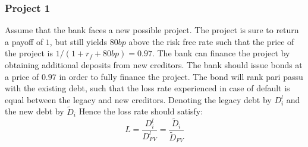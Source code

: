 \documentclass[10pt,a4paper]{article}
\begin{document}
    \subsubsection{Project 1}
            \newcommand{\legacydebt}{D_{i}^{l}}
            \newcommand{\newdebt}{\tilde{D}_{i}}
            \newcommand{\legacyfacevalue}{D_{FV}^{l}}
            \newcommand{\newfacevalue}{\tilde{D}_{FV}}
        Assume that the bank faces a new possible project. The project is sure to return a payoff of $1$, but still yields $80bp$ above the risk free rate such that the price of the project is $1 / (1 + r_{f} + 80bp) = 0.97$. The bank can finance the project by obtaining additional deposits from new creditors. The bank should issue bonds at a price of $0.97$ in order to fully finance the project. The bond will rank pari passu with the existing debt, such that the loss rate experienced in case of default is equal between the legacy and new creditors. Denoting the legacy debt by $\legacydebt$ and the new debt by $\newdebt$ Hence the loss rate should satisfy:
            \begin{equation}
                L = \frac{\legacydebt}{ \legacyfacevalue} = \frac{\newdebt}{\newfacevalue}
            \end{equation}
\end{document}
